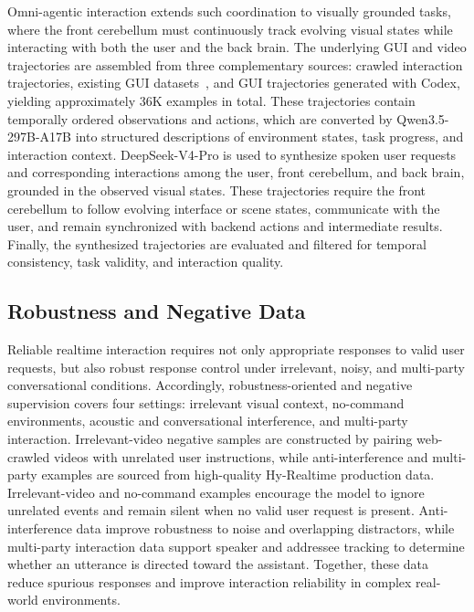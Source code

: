 Omni-agentic interaction extends such coordination to visually grounded tasks, where the front cerebellum must continuously track evolving visual states while interacting with both the user and the back brain. The underlying GUI and video trajectories are assembled from three complementary sources: crawled interaction trajectories, existing GUI datasets~\cite{wang2026opencua}, and GUI trajectories generated with Codex, yielding approximately 36K examples in total. These trajectories contain temporally ordered observations and actions, which are converted by Qwen3.5-297B-A17B into structured descriptions of environment states, task progress, and interaction context. DeepSeek-V4-Pro is used to synthesize spoken user requests and corresponding interactions among the user, front cerebellum, and back brain, grounded in the observed visual states. These trajectories require the front cerebellum to follow evolving interface or scene states, communicate with the user, and remain synchronized with backend actions and intermediate results. Finally, the synthesized trajectories are evaluated and filtered for temporal consistency, task validity, and interaction quality.

\subsection{Robustness and Negative Data}
Reliable realtime interaction requires not only appropriate responses to valid user requests, but also robust response control under irrelevant, noisy, and multi-party conversational conditions.
Accordingly, robustness-oriented and negative supervision covers four settings: irrelevant visual context, no-command environments, acoustic and conversational interference, and multi-party interaction.
Irrelevant-video negative samples are constructed by pairing web-crawled videos with unrelated user instructions, while anti-interference and multi-party examples are sourced from high-quality Hy-Realtime production data.
Irrelevant-video and no-command examples encourage the model to ignore unrelated events and remain silent when no valid user request is present.
Anti-interference data improve robustness to noise and overlapping distractors, while multi-party interaction data support speaker and addressee tracking to determine whether an utterance is directed toward the assistant.
Together, these data reduce spurious responses and improve interaction reliability in complex real-world environments.




